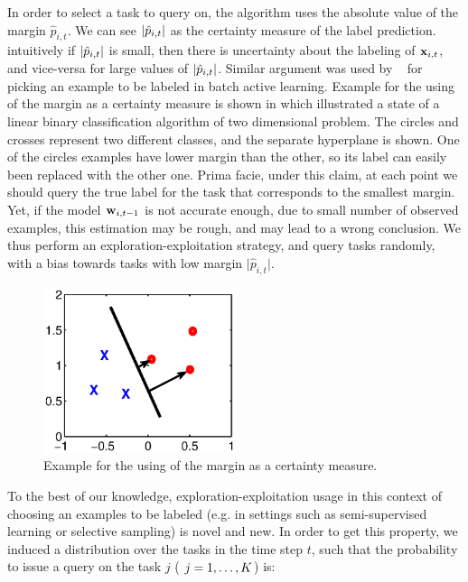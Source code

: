 In order to select a task to query on, the algorithm uses the absolute value of the margin 
$\hat{p}_{i,t}$. We can see $\left\vert{\hat{p}_{i,t}}\right\vert$ as the certainty measure of the label prediction.
 intuitively if $\left\vert{\hat{p}_{i,t}}\right\vert$ is small,
then there is uncertainty about the labeling of $\mathbf{x}_{i,t}$, and vice-versa for 
large values of $\left\vert{\hat{p}_{i,t}}\right\vert$. 
Similar argument was used by ~\cite{DBLP:conf/icml/TongK00} for picking an example to be labeled in 
batch active learning. 
Example for the using of the margin as a certainty measure is shown in  which illustrated 
a state of a linear binary classification algorithm of two dimensional problem. 
The circles and crosses represent two different classes, and the separate hyperplane is shown. 
One of the circles examples have lower margin than the other, so its label can easily been replaced 
with the other one.
Prima facie, under this claim, at each point we should query the true label for the task
 that corresponds to the smallest margin.  Yet, if the model $\mathbf{w}_{i,t-1}$ is not accurate enough, due to
 small number of observed examples, this estimation may be rough, and may lead to a wrong
conclusion. We thus perform an exploration-exploitation strategy, and
query tasks randomly, with a bias towards tasks with low margin
$\vert \hat{p}_{i,t} \vert$. 

\begin{figure}[h]
\begin{centering}
\includegraphics[width=0.5\textwidth]{figs/margin.eps}
\caption{Example for the using of the margin as a certainty measure.}
\label{fig:margin}
\end{centering}
\end{figure}


To the best of our knowledge,
exploration-exploitation usage in this context of choosing an examples
to be labeled (e.g. in settings such as semi-supervised learning or
selective sampling) is novel and new.  In order to get this property, we induced a
distribution over the tasks in the time step $t$, such that the probability to issue a query on the task 
$j$ ( $j=1 , \ldots , K$) is:

